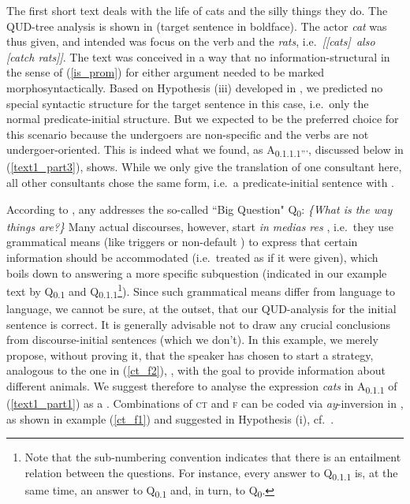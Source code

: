 \documentclass[output=paper,
,modfonts
,nonflat]{langsci/langscibook}
\begin{document}
\noindent The first short text deals with the life of cats and the silly things they do. The QUD-tree analysis is shown in  (target sentence in boldface).
 The actor \textit{cat} was thus given, and intended was focus on the verb and the  \textit{rats}, i.e.\ \textit{[[cats]\topic\ also [catch rats]\focus]\sq}. The text was
conceived in a way that no information-structural  in the sense of (\ref{is_prom}) for either argument needed to be marked morphosyntactically. Based on Hypothesis (iii) developed in , we predicted no special syntactic structure for the target sentence in this case, i.e.\ only the normal predicate-initial structure. But we expected  to be the preferred choice for this scenario because the undergoers are non-specific and the verbs are not undergoer-oriented. This is indeed what we found, as A\textsubscript{{0.1.1.1'''}}, discussed below in (\ref{text1_part3}), shows. While we only give the translation of one consultant here, all other consultants chose the same form, i.e.\ a predicate-initial sentence with .  

According to \cite{robcr12}, any  addresses the so-called ``Big Question" Q\textsubscript{0}: \textit{\{What is the way things are?\}}  Many actual discourses, however, start \textit{in medias res} \citep{firja92}, i.e.\ they use grammatical means (like  triggers or non-default ) to express that certain information should be accommodated (i.e.\ treated as if it were given), which boils down to answering a more specific subquestion (indicated in our example text by Q\textsubscript{{0.1}} and Q\textsubscript{{0.1.1}}\footnote{Note that the sub-numbering convention indicates that there is an entailment relation between the questions. For instance, every answer to Q\textsubscript{{0.1.1}} is, at the same time, an answer to Q\textsubscript{{0.1}} and, in turn, to Q\textsubscript{0}.}). Since such grammatical means differ from language to language, we cannot be sure, at the outset, that our QUD-analysis for the initial sentence is correct. It is generally advisable not to draw any crucial conclusions from discourse-initial sentences (which we don’t). In this example, we merely propose, without proving it, that the speaker has chosen to start a   strategy, analogous to the one in (\ref{ct_f2}), , with the goal to provide information about different animals. We suggest therefore to analyse the expression \textit{cats} in A\textsubscript{{0.1.1}} of (\ref{text1_part1}) as a . Combinations of \textsc{ct} and \textsc{f} can be coded via \textit{ay}-inversion in , as shown in example (\ref{ct_f1}) and suggested in Hypothesis (i), cf.\ \cite{latan17}.
\end{document}
